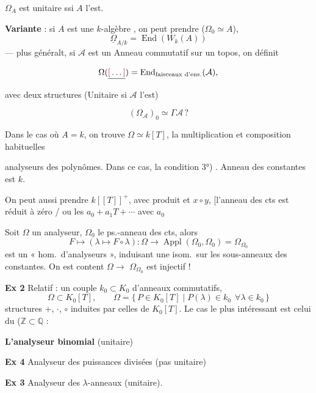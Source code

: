 \documentclass[11pt,a4paper]{article}
\begin{document}

$\Omega_A$ est unitaire ssi $A$ l'est.

\textbf{Variante} : si $A$ est une $k$-algèbre , on peut prendre ($\Omega_0 \simeq A$),
\[
\underline{\Omega}_{A/k} = \operatorname{End}(W_k(A))
\]
--- plus généralt, si $\mathcal{A}$ est un Anneau commutatif sur
un topos, on définit

\[
\Omega(\struck{\ill{}}) = \operatorname{End}_{\text{faisceaux d'ens.}}(\mathcal{A}) ,
\]
avec deux structures \struck{\ill{}}  (Unitaire si
$\mathcal{A}$ l'est)

\[
\boxed{(\Omega_{\mathcal{A}})_0 \simeq \Gamma \mathcal{A} \, ?}
\]


Dans le cas où $A = k$, on trouve $\Omega \simeq k[T]$,  la
 multiplication et composition habituelles

\ill{} analyseurs  des polynômes. Dans ce
cas, la condition 3°) . Anneau des constantes est $k$.

On peut aussi prendre $k[[T]]^{+}$, avec produit et $x \circ y$,
[l'anneau des cts est réduit à zéro / ou les $a_0 + a_1T + \cdots$ avec $a_0$

Soit $\Omega$ un analyseur, $\Omega_0$ le ps.-anneau
des cts, alors
\[
F \longmapsto (\lambda \mapsto F \circ \lambda) : \Omega \longrightarrow
\operatorname{Appl}(\Omega_0,\Omega_0) = \Omega_{\Omega_0}
\]
est un « hom.\ d'analyseurs », induisant une isom.\ sur les
sous-anneaux des constantes. On est content 
$\Omega \to$  $\Omega_{\Omega_0}$ est injectif !


\textbf{Ex 2} \quad Relatif : un couple $k_0 \subset K_0$ d'anneaux
commutatifs,
\[
\Omega \subset K_0[T], \qquad
\Omega = \{\, P \in K_0[T] \mid P(\lambda) \in k_0 \ \ \forall \lambda \in k_0 \,\}
\]
structures $+$, $\cdot$, $\circ$ induites par celles de $K_0[T]$. Le cas le
plus intéressant est celui du 
($\mathbb{Z} \subset \mathbb{Q}$ :

\textbf{L'analyseur binomial} \qquad (unitaire)

\textbf{Ex 4} \quad Analyseur des puissances divisées \qquad (pas unitaire)

\textbf{Ex 3} \quad Analyseur des $\lambda$-anneaux \qquad (unitaire).

\end{document}
